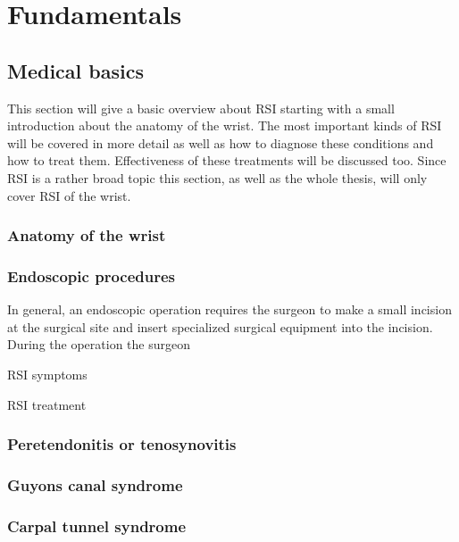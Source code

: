 \chapter{Fundamentals}
\label{sec:fundamentals}

\section{Medical basics}

This section will give a basic overview about \gls{RSI} starting with a small introduction about the anatomy of the wrist.
The most important kinds of \gls{RSI} will be covered in more detail as well as how to diagnose these conditions and how to treat them.
Effectiveness of these treatments will be discussed too.
Since \gls{RSI} is a rather broad topic this section, as well as the whole thesis, will only cover \gls{RSI} of the wrist.

\subsection{Anatomy of the wrist}

\subsection{Endoscopic procedures}

In general, an endoscopic operation requires the surgeon to make a small incision at the surgical site and insert specialized surgical equipment into the incision.
During the operation the surgeon

\gls{RSI} symptoms

\gls{RSI} treatment

\subsection{Peretendonitis or tenosynovitis}

\subsection{Guyons canal syndrome}

\subsection{Carpal tunnel syndrome}

